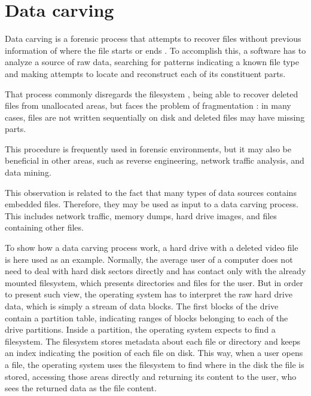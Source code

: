 \section{\label{sec:datacarving}Data carving}
Data carving is a forensic process that attempts to recover files without previous information of where the file starts or ends \cite{garfinkel_carving_2007}.
To accomplish this, a software has to analyze a source of raw data, searching for patterns indicating a known file type and making attempts to locate and reconstruct each of its constituent parts.

That process commonly disregards the filesystem \cite{veenman_statistical_2007}, being able to recover deleted files from unallocated areas, but faces the problem of fragmentation \cite{veenman_statistical_2007}  \cite{pal_evolution_2009}: in many cases, files are not written sequentially on disk and deleted files may have missing parts.

This procedure is frequently used in forensic environments, but it may also be beneficial in other areas, such as reverse engineering, network traffic analysis, and data mining.

This observation is related to the fact that many types of data sources contains embedded files. Therefore, they may be used as input to a data carving process. This includes network traffic, memory dumps, hard drive images, and files containing other files.

To show how a data carving process work, a hard drive with a deleted video file is here used as an example.
Normally, the average user of a computer does not need to deal with hard disk sectors directly and has contact only with the already mounted filesystem, which presents directories and files for the user. But in order to present such view, the operating system has to interpret the raw hard drive data, which is simply a stream of data blocks. The first blocks of the drive contain a partition table, indicating ranges of blocks belonging to each of the drive partitions. Inside a partition, the operating system expects to find a filesystem. The filesystem stores metadata about each file or directory and keeps an index indicating the position of each file on disk. This way, when a user opens a file, the operating system uses the filesystem to find where in the disk the file is stored, accessing those areas directly and returning its content to the user, who sees the returned data as the file content. 
 
